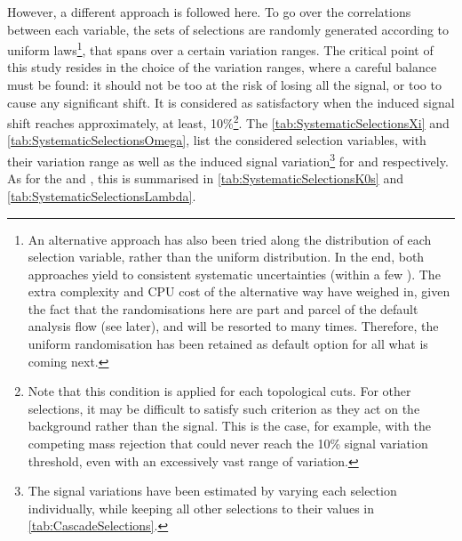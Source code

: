 However, a different approach is followed here. To go over the correlations between each variable, the sets of selections are randomly generated according to uniform laws\footnote{An alternative approach has also been tried along the  distribution of each selection variable, rather than the uniform distribution. In the end, both approaches yield to consistent systematic uncertainties (within a few \kmass). The extra complexity and CPU cost of the alternative way have weighed in, given the fact that the randomisations here are part and parcel of the default analysis flow (see later), and will be resorted to many times. Therefore, the uniform randomisation has been retained as default option for all what is coming next.}, that spans over a certain variation ranges. The critical point of this study resides in the choice of the variation ranges, where a careful balance must be found: it should not be too  at the risk of losing all the signal, or too  to cause any significant shift. It is considered as satisfactory when the induced signal shift reaches approximately, at least, 10\%\footnote{Note that this condition is applied for each topological cuts. For other selections, it may be difficult to satisfy such criterion as they act on the background rather than the signal. This is the case, for example, with the competing mass rejection that could never reach the 10\% signal variation threshold, even with an excessively vast range of variation.}. The \tabs\ref{tab:SystematicSelectionsXi} and \ref{tab:SystematicSelectionsOmega}, list the considered selection variables, with their variation range as well as the induced signal variation\footnote{The signal variations have been estimated by varying each selection individually, while keeping all other selections to their values in \tab\ref{tab:CascadeSelections}.} for \rmXi and \rmOmega respectively. As for the \rmKzeroS and \rmLambda, this is summarised in \tabs\ref{tab:SystematicSelectionsK0s} and \ref{tab:SystematicSelectionsLambda}. \\

